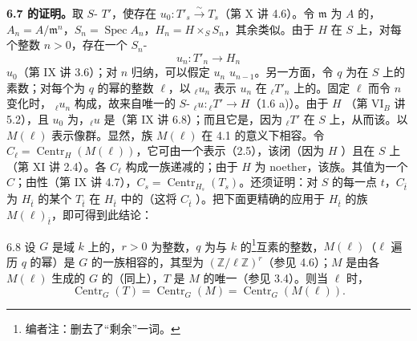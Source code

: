 \textbf{6.7 的证明。}取 $S$- $T'$，使存在 $u_0:T'_s\xrightarrow{\sim}T_s$（第 X 讲 4.6）。令 $\mathfrak m$ 为 $A$ 的，$A_n=A/\mathfrak m^n$，$S_n=\operatorname{Spec}A_n$，$H_n=H\times_SS_n$，其余类似。由于 $H$ 在 $S$ 上，对每个整数 $n>0$，存在一个 $S_n$-
\[u_n:T'_n\longrightarrow H_n\]
 $u_0$（第 IX 讲 3.6）；对 $n$ 归纳，可以假定 $u_n$  $u_{n-1}$。另一方面，令 $q$ 为在 $S$ 上的素数；对每个为 $q$ 的幂的整数 $\ell$，以 ${}_{\ell}u_n$ 表示 $u_n$ 在 ${}_{\ell}T'_n$ 上的。固定 $\ell$ 而令 $n$ 变化时， ${}_{\ell}u_n$ 构成，故来自唯一的 $S$- ${}_{\ell}u:{}_{\ell}T'\to H$（1.6 a)）。由于 $H$ （第 VI$_B$ 讲 5.2），且 $u_0$ 为，${}_{\ell}u$ 是（第 IX 讲 6.8）；而且它是，因为 ${}_{\ell}T'$ 在 $S$ 上，从而该。以 $M(\ell)$ 表示像群。显然，族 $M(\ell)$ 在 4.1 的意义下相容。令 $C_{\ell}=\operatorname{Centr}_H(M(\ell))$，它可由一个表示（2.5），该闭（因为 $H$ ）且在 $S$ 上（第 XI 讲 2.4）。各 $C_{\ell}$
构成一族递减的；由于 $H$ 为 noether，该族。其值为一个 $C$；由性（第 IX 讲 4.7），$C_s=\operatorname{Centr}_{H_s}(T_s)$。还须证明：对 $S$ 的每一点 $t$，$C_{\bar t}$ 为 $H_{\bar t}$ 的某个 $T_{\bar t}$ 在 $H_{\bar t}$ 中的（这将 $C_{\bar t}$ ）。把下面更精确的应用于 $H_{\bar t}$ 的族 $M(\ell)_{\bar t}$，即可得到此结论：
\begin{SGAresult}{}{6.8}
设 $G$ 是域 $k$ 上的，$r>0$ 为整数，$q$ 为与 $k$ 的\footnote{编者注：删去了“剩余”一词。}互素的整数，$M(\ell)$（$\ell$ 遍历 $q$ 的幂）是 $G$ 的一族相容的，其型为 $(\mathbb Z/\ell\mathbb Z)^r$（参见 4.6）；$M$ 是由各 $M(\ell)$ 生成的 $G$ 的（同上），$T$ 是 $M$ 的唯一（参见 3.4）。则当 $\ell$ 时，
\[\operatorname{Centr}_G(T)=\operatorname{Centr}_G(M)=\operatorname{Centr}_G(M(\ell)).\]
\end{SGAresult}
